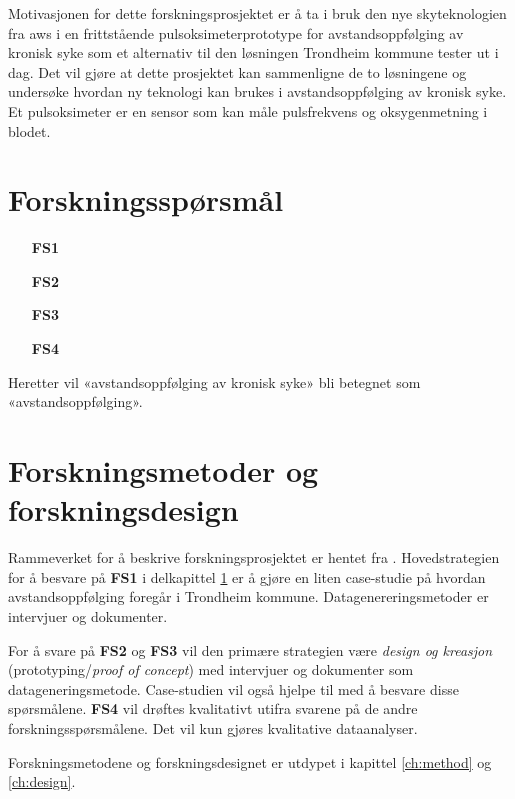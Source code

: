 Motivasjonen for dette forskningsprosjektet er å ta i bruk den nye skyteknologien fra \gls{aws} i en frittstående
pulsoksimeterprototype for avstandsoppfølging av kronisk syke som et alternativ til den løsningen Trondheim
kommune tester ut i dag. Det vil gjøre at dette prosjektet kan sammenligne de to løsningene og undersøke hvordan ny
teknologi kan brukes i avstandsoppfølging av kronisk syke. Et pulsoksimeter er en sensor som kan måle pulsfrekvens og oksygenmetning i blodet. 

\section{Forskningsspørsmål}
\label{sec:res_questions}

\begin{enumerate}
    \item[\textbf{FS1}] 
    \item[\textbf{FS2}] 
    \item[\textbf{FS3}] 
    \item[\textbf{FS4}] 
\end{enumerate}

Heretter vil «avstandsoppfølging av kronisk syke» bli betegnet som «avstandsoppfølging».

\section{Forskningsmetoder og forskningsdesign}
Rammeverket for å beskrive forskningsprosjektet er hentet fra \citet{oates}. Hovedstrategien for å besvare på \textbf{FS1} i
delkapittel \ref{sec:res_questions} er å gjøre en liten case-studie på hvordan avstandsoppfølging foregår i Trondheim kommune. Datagenereringsmetoder
er intervjuer og dokumenter. 

For å svare på \textbf{FS2} og \textbf{FS3} vil den primære strategien være \textit{design og kreasjon} (prototyping/\textit{proof of concept})
med intervjuer og dokumenter som datageneringsmetode. Case-studien vil også hjelpe til med å besvare disse spørsmålene. \textbf{FS4} vil drøftes kvalitativt 
utifra svarene på de andre forskningsspørsmålene. Det vil kun gjøres kvalitative dataanalyser.

Forskningsmetodene og forskningsdesignet er utdypet i kapittel \ref{ch:method} og \ref{ch:design}.

